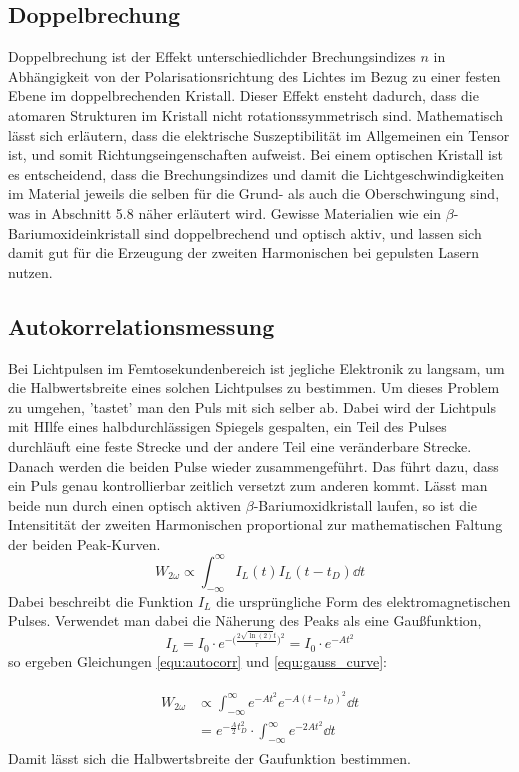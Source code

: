\subsection{Doppelbrechung}
Doppelbrechung ist der Effekt unterschiedlichder Brechungsindizes $n$ in Abhängigkeit von
der Polarisationsrichtung des Lichtes im Bezug zu einer festen Ebene im doppelbrechenden Kristall. Dieser Effekt ensteht dadurch, dass die atomaren Strukturen im Kristall nicht rotationssymmetrisch sind. Mathematisch
lässt sich erläutern, dass die elektrische Suszeptibilität im Allgemeinen ein Tensor ist, und somit Richtungseingenschaften aufweist. 
Bei einem optischen Kristall ist es entscheidend, dass die Brechungsindizes und damit die Lichtgeschwindigkeiten
im Material jeweils die selben für die Grund- als auch die Oberschwingung sind, was in Abschnitt 5.8 näher erläutert wird.
Gewisse Materialien wie ein $\beta$-Bariumoxideinkristall sind doppelbrechend und optisch aktiv,
und lassen sich damit gut für die Erzeugung der zweiten Harmonischen bei gepulsten Lasern nutzen.

\subsection{Autokorrelationsmessung}
Bei Lichtpulsen im Femtosekundenbereich ist jegliche Elektronik zu langsam, um die Halbwertsbreite
eines solchen Lichtpulses zu bestimmen. Um dieses Problem zu umgehen, 'tastet' man den Puls mit sich selber ab.
Dabei wird der Lichtpuls mit HIlfe eines halbdurchlässigen Spiegels gespalten, ein Teil des Pulses durchläuft eine feste Strecke und der andere Teil eine veränderbare Strecke. Danach werden die beiden Pulse wieder zusammengeführt.
Das führt dazu, dass ein Puls genau kontrollierbar zeitlich versetzt zum anderen kommt.
Lässt man beide nun durch einen optisch aktiven $\beta$-Bariumoxidkristall laufen, so ist die Intensitität der zweiten Harmonischen proportional zur mathematischen Faltung der beiden Peak-Kurven.
\begin{equation}
  W_{2\omega} \propto \int_{-\infty}^{\infty}{I_L(t)I_L(t-t_D)\dd{t}}
  \label{equ:autocorr}
\end{equation}
Dabei beschreibt die Funktion $I_L$ die ursprüngliche Form des elektromagnetischen Pulses.
Verwendet man dabei die Näherung des Peaks als eine Gaußfunktion,
\begin{equation}
  I_L = I_0 \cdot e^{-\big(\frac{2\sqrt{\ln(2)}t}{\tau}\big)^2} = I_0 \cdot e^{-At^2}
  \label{equ:gauss_curve}
\end{equation}
so ergeben Gleichungen \ref{equ:autocorr} und \ref{equ:gauss_curve}:

\begin{align}
\begin{split}
  W_{2\omega} & \propto \int_{-\infty}^{\infty} e^{-At^2} e^{-A(t-t_D)^2} \dd{t} \\
& = e^{-\frac{A}{2} t_D^2} \cdot \int_{-\infty}^{\infty} e^{-2At^2} \dd{t}
\label{eq:Autokorr}
\end{split}
\end{align}
Damit lässt sich die Halbwertsbreite der Gaufunktion bestimmen.


